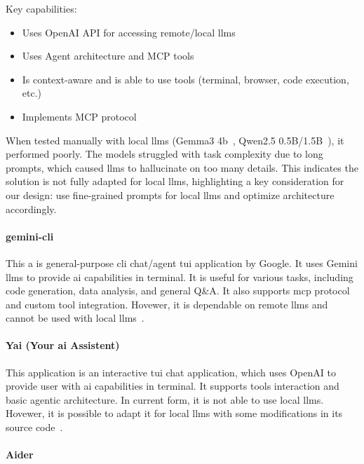 Key capabilities:
\begin{itemize}
  \item Uses OpenAI API for accessing remote/local \glspl{llm}
  \item Uses Agent architecture and MCP tools
  \item Is context-aware and is able to use tools (terminal, browser,
    code execution, etc.)
  \item Implements MCP protocol
\end{itemize}

When tested manually with local \glspl{llm} (Gemma3 4b~\cite{gemma-web}, Qwen2.5
0.5B/1.5B~\cite{qwen-web}), it performed poorly. The models struggled with task
complexity due to long prompts, which caused \glspl{llm} to hallucinate on too
many details. This indicates the solution is not fully adapted for local
\glspl{llm}, highlighting a key consideration for our design: use fine-grained
prompts for local \glspl{llm} and optimize architecture accordingly.

\paragraph{gemini-cli}

This a is general-purpose \gls{cli} chat/agent \gls{tui} application
by Google. It uses Gemini \glspl{llm} to provide \gls{ai}
capabilities in terminal. It is useful for various tasks, including
code generation, data analysis, and general Q\&A. It also supports
\gls{mcp} protocol and custom tool integration. Hovewer, it is
dependable on remote \glspl{llm} and cannot be used with local
\glspl{llm}~\cite{gemini-web,gemini-docs}.

\paragraph{Yai (Your \gls{ai} Assistent)}

This application is an interactive \gls{tui} chat application, which
uses OpenAI to
provide user with \gls{ai} capabilities in terminal. It supports
tools interaction
and basic agentic architecture. In current form, it is not able to use local
\glspl{llm}. Hovewer, it is possible to adapt it for local \gls{llm}s
with some modifications
in its source code~\cite{yai-web,yai-docs}.

\paragraph{Aider}

